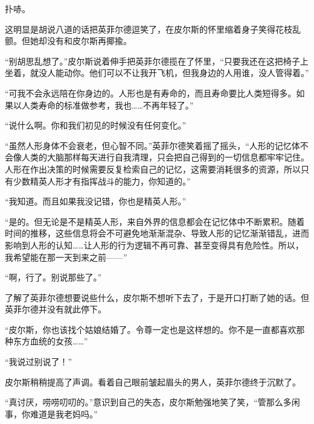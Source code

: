 扑哧。

这明显是胡说八道的话把英菲尔德逗笑了，在皮尔斯的怀里缩着身子笑得花枝乱颤。但她却没有和皮尔斯再揶揄。

“别胡思乱想了。”皮尔斯说着伸手把英菲尔德揽在了怀里，“只要我还在这把椅子上坐着，就没人能动你。他们可以不让我开飞机，但我身边的人用谁，没人管得着。”

“可我不会永远陪在你身边的。人形也是有寿命的，而且寿命要比人类短得多。如果以人类寿命的标准做参考，我也……不再年轻了。”

“说什么啊。你和我们初见的时候没有任何变化。”

“虽然人形身体不会衰老，但心智不同。”英菲尔德笑着摇了摇头，“人形的记忆体不会像人类的大脑那样每天进行自我清理，只会把自己得到的一切信息都牢牢记住。人形在作出决策的时候需要反复检索自己的记忆，这需要消耗很多的资源，所以只有少数精英人形才有指挥战斗的能力，你知道的。”

“我知道。而且如果我没记错，你也是精英人形。”

“是的。但无论是不是精英人形，来自外界的信息都会在记忆体中不断累积。随着时间的推移，这些信息将会不可避免地渐渐混杂、导致人形的记忆渐渐错乱，进而影响到人形的认知……让人形的行为逻辑不再可靠、甚至变得具有危险性。所以，我希望能在那一天到来之前——”

“啊，行了。别说那些了。”

了解了英菲尔德想要说些什么，皮尔斯不想听下去了，于是开口打断了她的话。但英菲尔德并没有就此停下。

“皮尔斯，你也该找个姑娘结婚了。令尊一定也是这样想的。你不是一直都喜欢那种东方血统的女孩……”

“我说过别说了！”

皮尔斯稍稍提高了声调。看着自己眼前皱起眉头的男人，英菲尔德终于沉默了。

“真讨厌，唠唠叨叨的。”意识到自己的失态，皮尔斯勉强地笑了笑，“管那么多闲事，你难道是我老妈吗。”

